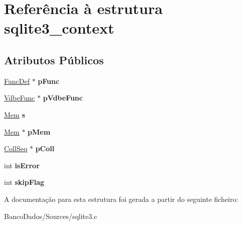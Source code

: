 \hypertarget{structsqlite3__context}{\section{Referência à estrutura sqlite3\-\_\-context}
\label{structsqlite3__context}
}
\subsection*{Atributos Públicos}
\begin{DoxyCompactItemize}
\item 
\hypertarget{structsqlite3__context_af4215c87be2c0cb10868f623a552a2aa}{\hyperlink{struct_func_def}{Func\-Def} $\ast$ {\bfseries p\-Func}}\label{structsqlite3__context_af4215c87be2c0cb10868f623a552a2aa}

\item 
\hypertarget{structsqlite3__context_af35405f4f62cfc0b81bb2eb6c82b2363}{\hyperlink{struct_vdbe_func}{Vdbe\-Func} $\ast$ {\bfseries p\-Vdbe\-Func}}\label{structsqlite3__context_af35405f4f62cfc0b81bb2eb6c82b2363}

\item 
\hypertarget{structsqlite3__context_a53d44518a1f7f57ce5a2d73b6e8d2c14}{\hyperlink{struct_mem}{Mem} {\bfseries s}}\label{structsqlite3__context_a53d44518a1f7f57ce5a2d73b6e8d2c14}

\item 
\hypertarget{structsqlite3__context_a7b84aa5920329cb0eb943832175b48b5}{\hyperlink{struct_mem}{Mem} $\ast$ {\bfseries p\-Mem}}\label{structsqlite3__context_a7b84aa5920329cb0eb943832175b48b5}

\item 
\hypertarget{structsqlite3__context_a4e4b12fb65814515fdb967559693f816}{\hyperlink{struct_coll_seq}{Coll\-Seq} $\ast$ {\bfseries p\-Coll}}\label{structsqlite3__context_a4e4b12fb65814515fdb967559693f816}

\item 
\hypertarget{structsqlite3__context_ae4351b8da8c6d2676074612c1b8d4af5}{int {\bfseries is\-Error}}\label{structsqlite3__context_ae4351b8da8c6d2676074612c1b8d4af5}

\item 
\hypertarget{structsqlite3__context_aaee18da17fe31959469aa1ca9b9e1406}{int {\bfseries skip\-Flag}}\label{structsqlite3__context_aaee18da17fe31959469aa1ca9b9e1406}

\end{DoxyCompactItemize}


A documentação para esta estrutura foi gerada a partir do seguinte ficheiro\-:\begin{DoxyCompactItemize}
\item 
Banco\-Dados/\-Sources/sqlite3.\-c\end{DoxyCompactItemize}
